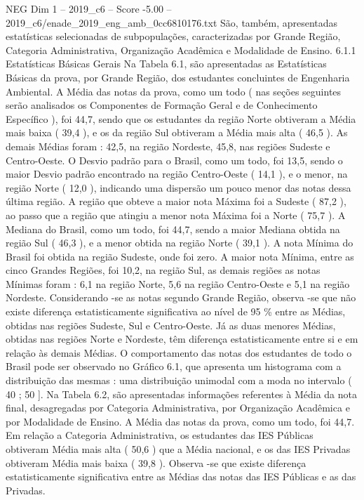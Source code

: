 \begin{textsample}{NEG Dim 1 – 2019\_c6 – Score -5.00 – 2019\_c6/enade\_2019\_eng\_amb\_0cc6810176.txt}
São, também, apresentadas estatísticas selecionadas de subpopulações, caracterizadas por Grande Região, Categoria Administrativa, Organização Acadêmica e Modalidade de Ensino. 6.1.1 Estatísticas Básicas Gerais Na Tabela 6.1, são apresentadas as Estatísticas Básicas da prova, por Grande Região, dos estudantes concluintes de Engenharia Ambiental.
A Média das notas da prova, como um todo ( nas seções seguintes serão analisados os Componentes de Formação Geral e de Conhecimento Específico ), foi 44,7, sendo que os estudantes da região Norte obtiveram a Média mais baixa ( 39,4 ), e os da região Sul obtiveram a Média mais alta ( 46,5 ).
As demais Médias foram : 42,5, na região Nordeste, 45,8, nas regiões Sudeste e Centro-Oeste.
O Desvio padrão para o Brasil, como um todo, foi 13,5, sendo o maior Desvio padrão encontrado na região Centro-Oeste ( 14,1 ), e o menor, na região Norte ( 12,0 ), indicando uma dispersão um pouco menor das notas dessa última região.
A região que obteve a maior nota Máxima foi a Sudeste ( 87,2 ), ao passo que a região que atingiu a menor nota Máxima foi a Norte ( 75,7 ).
A Mediana do Brasil, como um todo, foi 44,7, sendo a maior Mediana obtida na região Sul ( 46,3 ), e a menor obtida na região Norte ( 39,1 ).
A nota Mínima do Brasil foi obtida na região Sudeste, onde foi zero.
A maior nota Mínima, entre as cinco Grandes Regiões, foi 10,2, na região Sul, as demais regiões as notas Mínimas foram : 6,1 na região Norte, 5,6 na região Centro-Oeste e 5,1 na região Nordeste.
Considerando -se as notas segundo Grande Região, observa -se que não existe diferença estatisticamente significativa ao nível de 95 \% entre as Médias, obtidas nas regiões Sudeste, Sul e Centro-Oeste.
Já as duas menores Médias, obtidas nas regiões Norte e Nordeste, têm diferença estatisticamente entre si e em relação às demais Médias.
O comportamento das notas dos estudantes de todo o Brasil pode ser observado no Gráfico 6.1, que apresenta um histograma com a distribuição das mesmas : uma distribuição unimodal com a moda no intervalo ( 40 ; 50 ].
Na Tabela 6.2, são apresentadas informações referentes à Média da nota final, desagregadas por Categoria Administrativa, por Organização Acadêmica e por Modalidade de Ensino.
A Média das notas da prova, como um todo, foi 44,7.
Em relação a Categoria Administrativa, os estudantes das IES Públicas obtiveram Média mais alta ( 50,6 ) que a Média nacional, e os das IES Privadas obtiveram Média mais baixa ( 39,8 ).
Observa -se que existe diferença estatisticamente significativa entre as Médias das notas das IES Públicas e as das Privadas.

\end{textsample}
